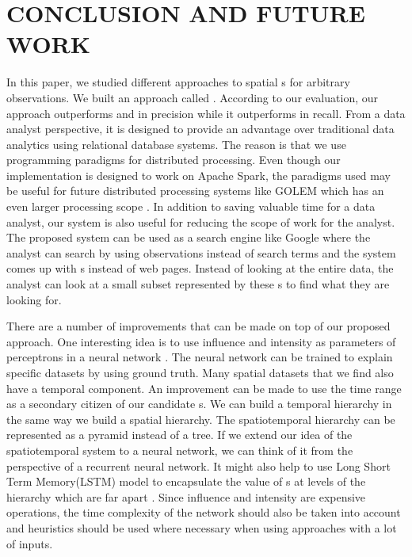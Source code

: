 \section{CONCLUSION AND FUTURE WORK}
\label{chp:concl}
In this paper, we studied different approaches to spatial {\explanation}s for arbitrary observations. We built an approach called {\solution}. According to our evaluation, our approach outperforms {\aggravation} and {\intervention} in precision while it outperforms {\aggravation} in recall. From a data analyst perspective, it is designed to provide an advantage over traditional data analytics using relational database systems. The reason is that we use programming paradigms for distributed processing. Even though our implementation is designed to work on Apache Spark, the paradigms used may be useful for future distributed processing systems like GOLEM which has an even larger processing scope \cite{golem2018}. In addition to saving valuable time for a data analyst, our system is also useful for reducing the scope of work for the analyst. The proposed system can be used as a search engine like Google where the analyst can search by using observations instead of search terms and the system comes up with {\explanation}s instead of web pages. Instead of looking at the entire data, the analyst can look at a small subset represented by these {\explanation}s to find what they are looking for.

There are a number of improvements that can be made on top of our proposed approach. One interesting idea is to use influence and intensity as parameters of perceptrons in a neural network \cite{grossberg1988nonlinear,widrow199030}. The neural network can be trained to explain specific datasets by using ground truth.
Many spatial datasets that we find also have a temporal component. An improvement can be made to use the time range as a secondary citizen of our candidate {\explanation}s. We can build a temporal hierarchy in the same way we build a spatial hierarchy. The spatiotemporal hierarchy can be represented as a pyramid instead of a tree.
If we extend our idea of the spatiotemporal system to a neural network, we can think of it from the perspective of a recurrent neural network\cite{chung2016hierarchical}. It might also help to use Long Short Term Memory(LSTM) model to encapsulate the value of {\explanation}s at levels of the hierarchy which are far apart \cite{hochreiter1997long}.
Since influence and intensity are expensive operations, the time complexity of the network should also be taken into account and heuristics should be used where necessary when using approaches with a lot of inputs.

